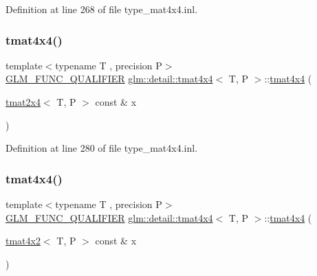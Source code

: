 Definition at line 268 of file type\+\_\+mat4x4.\+inl.

\mbox{\label{structglm_1_1detail_1_1tmat4x4_a5f597f1c55c9446e2c54dff6258f5e39}} 
\subsubsection{\texorpdfstring{tmat4x4()}{tmat4x4()}\hspace{0.1cm}{\footnotesize\ttfamily [15/22]}}
{\footnotesize\ttfamily template$<$typename T , precision P$>$ \\
\hyperlink{setup_8hpp_a33fdea6f91c5f834105f7415e2a64407}{G\+L\+M\+\_\+\+F\+U\+N\+C\+\_\+\+Q\+U\+A\+L\+I\+F\+I\+ER} \hyperlink{structglm_1_1detail_1_1tmat4x4}{glm\+::detail\+::tmat4x4}$<$ T, P $>$\+::\hyperlink{structglm_1_1detail_1_1tmat4x4}{tmat4x4} (\begin{DoxyParamCaption}\item[{\hyperlink{structglm_1_1detail_1_1tmat2x4}{tmat2x4}$<$ T, P $>$ const \&}]{x }\end{DoxyParamCaption})\hspace{0.3cm}{\ttfamily [explicit]}}



Definition at line 280 of file type\+\_\+mat4x4.\+inl.

\mbox{\label{structglm_1_1detail_1_1tmat4x4_a339939b1266e7b6feb494087b9c4943f}} 
\subsubsection{\texorpdfstring{tmat4x4()}{tmat4x4()}\hspace{0.1cm}{\footnotesize\ttfamily [16/22]}}
{\footnotesize\ttfamily template$<$typename T , precision P$>$ \\
\hyperlink{setup_8hpp_a33fdea6f91c5f834105f7415e2a64407}{G\+L\+M\+\_\+\+F\+U\+N\+C\+\_\+\+Q\+U\+A\+L\+I\+F\+I\+ER} \hyperlink{structglm_1_1detail_1_1tmat4x4}{glm\+::detail\+::tmat4x4}$<$ T, P $>$\+::\hyperlink{structglm_1_1detail_1_1tmat4x4}{tmat4x4} (\begin{DoxyParamCaption}\item[{\hyperlink{structglm_1_1detail_1_1tmat4x2}{tmat4x2}$<$ T, P $>$ const \&}]{x }\end{DoxyParamCaption})\hspace{0.3cm}{\ttfamily [explicit]}}



